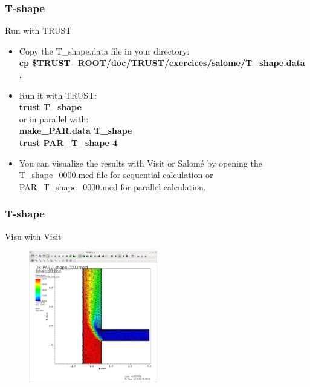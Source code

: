 \documentclass[10pt]{beamer}
\begin{document}
\begin{frame}
\frametitle{T-shape}
\begin{block}{Run with TRUST}

\begin{itemize}
\item Copy the T\_shape.data file in your directory:\\
\textbf{cp \$TRUST\_ROOT/doc/TRUST/exercices/salome/T\_shape.data  .}

\item Run it with TRUST:\\
\textbf{trust T\_shape}\\
or in parallel with:\\
\textbf{make\_PAR.data T\_shape}\\
\textbf{trust PAR\_T\_shape 4}\\

\item You can visualize the results with Visit or Salom\'e by opening the T\_shape\_0000.med file for sequential calculation or PAR\_T\_shape\_0000.med for parallel calculation.
\end{itemize}

\end{block}
\end{frame}
\begin{frame}
\frametitle{T-shape}
\begin{block}{Visu with Visit}

\begin{figure}
\includegraphics[width=0.5\textwidth]{PICTURES/salome18.jpg}
\end{figure}

\end{block}
\end{frame}
\end{document}
